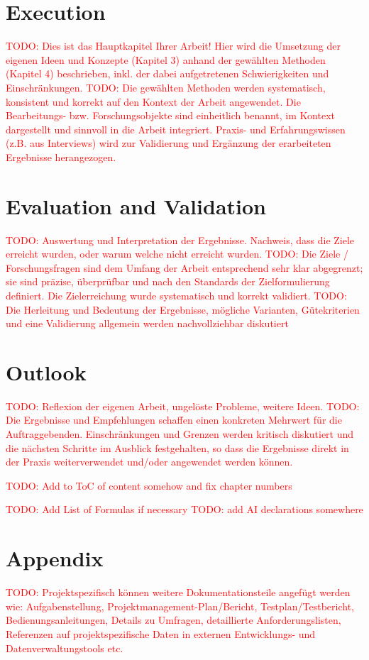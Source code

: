 \documentclass[a4paper,12pt]{report}
\renewcommand{\todo}[1]{\textcolor{red}{TODO: #1}}
\begin{document}
	\chapter{Execution}
		\todo{Dies ist das Hauptkapitel Ihrer Arbeit! Hier wird die Umsetzung der eigenen Ideen und Konzepte (Kapitel 3) anhand der gewählten Methoden (Kapitel 4) beschrieben, inkl. der dabei aufgetretenen Schwierigkeiten und Einschränkungen.}
		\todo{Die gewählten Methoden werden systematisch, konsistent und korrekt auf den Kontext der Arbeit angewendet. Die Bearbeitungs- bzw. Forschungsobjekte sind einheitlich benannt, im Kontext dargestellt und sinnvoll in die Arbeit integriert. Praxis- und Erfahrungswissen (z.B. aus Interviews) wird zur Validierung und Ergänzung der erarbeiteten Ergebnisse herangezogen. }
	
	\chapter{Evaluation and Validation}
		\todo{Auswertung und Interpretation der Ergebnisse. Nachweis, dass die Ziele erreicht wurden, oder warum	welche nicht erreicht wurden.}
		\todo{Die Ziele / Forschungsfragen sind dem Umfang der Arbeit entsprechend sehr klar abgegrenzt; sie sind präzise, überprüfbar und nach den Standards der Zielformulierung definiert. Die Zielerreichung wurde systematisch und korrekt validiert.}
		\todo{Die Herleitung und Bedeutung der Ergebnisse, mögliche Varianten, Gütekriterien und eine Validierung allgemein werden nachvollziehbar diskutiert}
	
	\chapter{Outlook}
		\todo{Reflexion der eigenen Arbeit, ungelöste Probleme, weitere Ideen.}
		\todo{Die Ergebnisse und Empfehlungen schaffen einen konkreten Mehrwert für die Auftraggebenden. Einschränkungen und Grenzen werden kritisch diskutiert und die nächsten Schritte im Ausblick festgehalten, so dass die Ergebnisse direkt in der Praxis weiterverwendet und/oder angewendet werden können.}
	
	\printglossary
	\todo{Add to ToC of content somehow and fix chapter numbers}
	

	\listoffigures
	
	\listoftables
	\todo{Add List of Formulas if necessary}
	\todo{add AI declarations somewhere}
	
	\printbibliography
	
	\appendix
	\chapter{Appendix}
		\todo{Projektspezifisch können weitere Dokumentationsteile angefügt werden wie: Aufgabenstellung, Projektmanagement-Plan/Bericht, Testplan/Testbericht, Bedienungsanleitungen, Details zu Umfragen, detaillierte Anforderungslisten, Referenzen auf projektspezifische Daten in externen Entwicklungs- und Datenverwaltungstools etc.}
	
\end{document}
